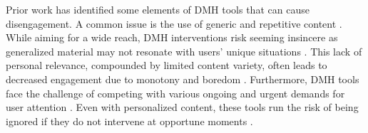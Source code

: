 Prior work has identified some elements of DMH tools that can cause disengagement. A common issue is the use of generic and repetitive content \cite{bhattacharjee2022design, rennick2016health, brown2014mobile}. While aiming for a wide reach, DMH interventions risk seeming insincere as generalized material may not resonate with users' unique situations \cite{bhattacharjee2023investigating, slovak2023designing, jardine2023between}. This lack of personal relevance, compounded by limited content variety, often leads to decreased engagement due to monotony and boredom \cite{brown2014mobile, jardine2023between}.
Furthermore, DMH tools face the challenge of competing with various ongoing and urgent demands for user attention \cite{muench2017more}. Even with personalized content, these tools run the risk of being ignored if they do not intervene at opportune moments \cite{bhattacharjee2022design}. 


